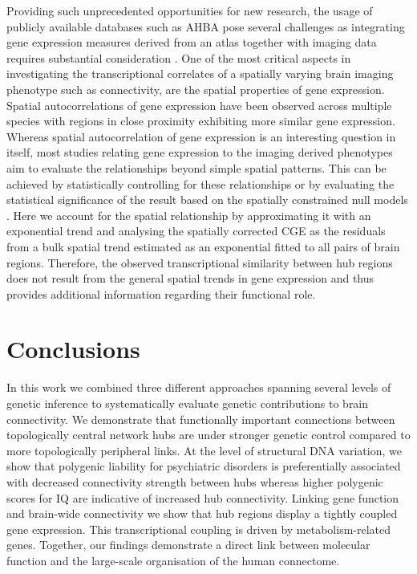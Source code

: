 Providing such unprecedented opportunities for new research, the usage of publicly available databases such as AHBA pose several challenges as integrating gene expression measures derived from an atlas together with imaging data requires substantial consideration \citep{Arnatkeviciute2019,Fornito2019}. One of the most critical aspects in investigating the transcriptional correlates of a spatially varying brain imaging phenotype such as connectivity, are the spatial properties of gene expression. Spatial autocorrelations of gene expression have been observed across multiple species \citep{Arnatkeviciute2018,Burt2018,Fornito2019,Fulcher2016} with regions in close proximity exhibiting more similar gene expression. Whereas spatial autocorrelation of gene expression is an interesting question in itself, most studies relating gene expression to the imaging derived phenotypes aim to evaluate the relationships beyond simple spatial patterns. This can be achieved by statistically controlling for these relationships \citep{Fakhry2015a,Fulcher2016} or by evaluating the statistical significance of the result based on the spatially constrained null models \citep{Burt2018,Romero-Garcia2018,Whitaker2016a,Vasa2018,Vertes2016b}. Here we account for the spatial relationship by approximating it with an exponential trend and analysing the spatially corrected CGE as the residuals from a bulk spatial trend estimated as an exponential fitted to all pairs of brain regions. Therefore, the observed transcriptional similarity between hub regions does not result from the general spatial trends in gene expression and thus provides additional information regarding their functional role.

\section{Conclusions}
In this work we combined three different approaches spanning several levels of genetic inference to systematically evaluate genetic contributions to brain connectivity. We demonstrate that functionally important connections between topologically central network hubs are under stronger genetic control compared to more topologically peripheral links. At the level of structural DNA variation, we show that polygenic liability for psychiatric disorders is preferentially associated with decreased connectivity strength between hubs whereas higher polygenic scores for IQ are indicative of increased hub connectivity. Linking gene function and brain-wide connectivity we show that hub regions display a tightly coupled gene expression. This transcriptional coupling is driven by metabolism-related genes. Together, our findings demonstrate a direct link between molecular function and the large-scale organisation of the human connectome.
